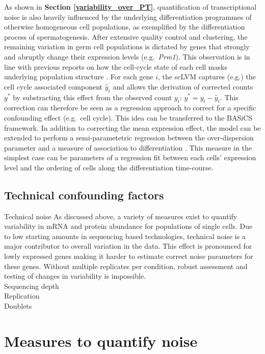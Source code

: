 \newpage
 
As shown in \textbf{Section \ref{variability_over_PT}}, quantification of transcriptional noise is also heavily influenced by the underlying differentiation programmes of otherwise homogeneous cell populations, as exemplified by the differentiation process of spermatogenesis. After extensive quality control and clustering, the remaining variation in germ cell populations is dictated by genes that strongly and abruptly change their expression levels (e.g.~\textit{Prm1}). This observation is in line with previous reports on how the cell-cycle state of each cell masks underlying population structure \citep{Buettner2015}. For each gene $i$, the \gls{scLVM} captures (e.g.) the cell cycle associated component $\hat{y}_i$ and allows the derivation of corrected counts $y^{\ast}$ by substracting this effect from the observed count $y_i$: $y^{\ast}=y_i-\hat{y}_i$. This correction can therefore be seen as a regression approach to correct for a specific confounding effect (e.g.~cell cycle). This idea can be transferred to the BASiCS framework. In addition to correcting the mean expression effect, the model can be extended to perform a semi-parametetric regression between the over-dispersion parameter and a measure of association to differentiation . This measure in the simplest case can be parameters of a regression fit between each cells' expression level and the ordering of cells along the differentiation time-course. \\

\subsection{Technical confounding factors}

Technical noise
As discussed above, a variety of measures exist to quantify variability in mRNA and protein abundance for populations of single cells. Due to low starting amounts in sequencing based technologies, technical noise is a major contributor to overall variation in the data. This effect is pronounced for lowly expressed genes making it harder to estimate correct noise parameters for these genes. Without multiple replicates per condition, robust assessment and testing of changes in variability is impossible.\\

Sequencing depth\\
Replication\\
Doublets

\section{Measures to quantify noise}


